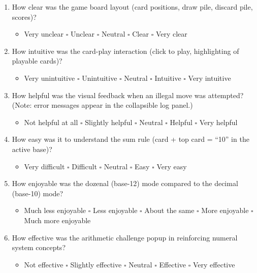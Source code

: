 \documentclass[12pt, titlepage]{article}
\begin{document}
\begin{enumerate}
  \item How clear was the game board layout (card positions, draw pile, discard pile, scores)?
  \begin{itemize}[label=$\square$]
    \item Very unclear \quad $\square$ Unclear \quad $\square$ Neutral \quad $\square$ Clear \quad $\square$ Very clear
  \end{itemize}
  \item How intuitive was the card-play interaction (click to play, highlighting of playable cards)?
  \begin{itemize}[label=$\square$]
    \item Very unintuitive \quad $\square$ Unintuitive \quad $\square$ Neutral \quad $\square$ Intuitive \quad $\square$ Very intuitive
  \end{itemize}
  \item How helpful was the visual feedback when an illegal move was attempted? (Note: error messages appear in the collapsible log panel.)
  \begin{itemize}[label=$\square$]
    \item Not helpful at all \quad $\square$ Slightly helpful \quad $\square$ Neutral \quad $\square$ Helpful \quad $\square$ Very helpful
  \end{itemize}
  \item How easy was it to understand the sum rule (card + top card = ``10'' in the active base)?
  \begin{itemize}[label=$\square$]
    \item Very difficult \quad $\square$ Difficult \quad $\square$ Neutral \quad $\square$ Easy \quad $\square$ Very easy
  \end{itemize}
  \item How enjoyable was the dozenal (base-12) mode compared to the decimal (base-10) mode?
  \begin{itemize}[label=$\square$]
    \item Much less enjoyable \quad $\square$ Less enjoyable \quad $\square$ About the same \quad $\square$ More enjoyable \quad $\square$ Much more enjoyable
  \end{itemize}
  \item How effective was the arithmetic challenge popup in reinforcing numeral system concepts?
  \begin{itemize}[label=$\square$]
    \item Not effective \quad $\square$ Slightly effective \quad $\square$ Neutral \quad $\square$ Effective \quad $\square$ Very effective

\end{itemize}
\end{enumerate}
\end{document}
